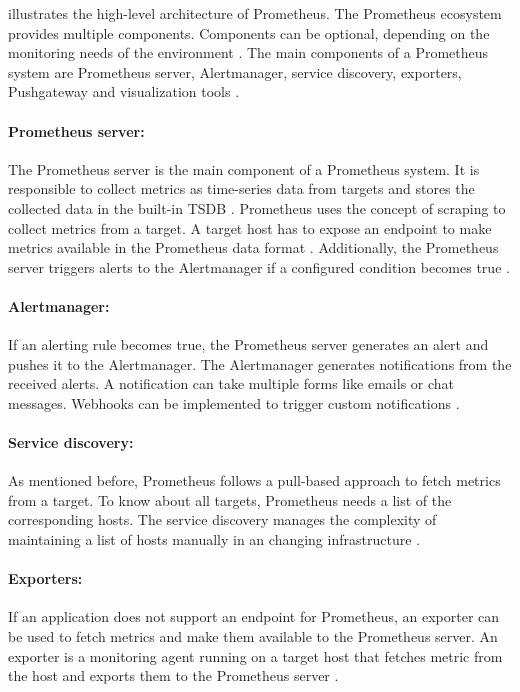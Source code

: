 illustrates the high-level architecture of Prometheus.
The Prometheus ecosystem provides multiple components. Components can be optional, depending on the monitoring needs of the environment \cite{Bastos2019Prom}. The main components of a Prometheus system are Prometheus server, Alertmanager, service discovery, exporters, Pushgateway and visualization tools \cite{Prom2020Docs}.


\paragraph{Prometheus server:} 
The Prometheus server is the main component of a Prometheus system. It is responsible to collect metrics as time-series data from targets and stores the collected data in the built-in TSDB \cite{Bastos2019Prom}. Prometheus uses the concept of scraping to collect metrics from a target. A target host has to expose an endpoint to make metrics available in the Prometheus data format \cite{Pandey2020Monitoring}. Additionally, the Prometheus server triggers alerts to the Alertmanager if a configured condition becomes true \cite{Prom2020Docs}.


\paragraph{Alertmanager:}
If an alerting rule becomes true, the Prometheus server generates an alert and pushes it to the Alertmanager. The Alertmanager generates notifications from the received alerts. A notification can take multiple forms like emails or chat messages. Webhooks can be implemented to trigger custom notifications \cite{Bastos2019Prom}.


\paragraph{Service discovery:}
As mentioned before, Prometheus follows a pull-based approach to fetch metrics from a target. To know about all targets, Prometheus needs a list of the corresponding hosts. The service discovery manages the complexity of maintaining a list of hosts manually in an changing infrastructure \cite{Bastos2019Prom}.


\paragraph{Exporters:}
If an application does not support an endpoint for Prometheus, an exporter can be used to fetch metrics and make them available to the Prometheus server. An exporter is a monitoring agent running on a target host that fetches metric from the host and exports them to the Prometheus server \cite{Pandey2020Monitoring}.


